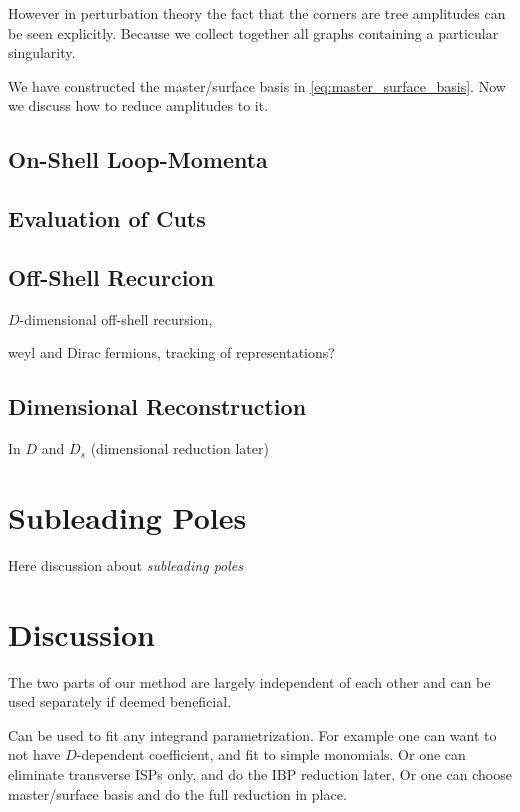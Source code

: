 However in perturbation theory the fact that the corners are tree amplitudes can be seen explicitly.
Because we collect together all graphs containing a particular singularity.


We have constructed the master/surface basis in \cref{eq:master_surface_basis}. Now we discuss how
to reduce amplitudes to it.


\subsection{On-Shell Loop-Momenta}


\subsection{Evaluation of Cuts}

\subsection{Off-Shell Recurcion}
\label{sec:BG_recursion}

$D$-dimensional off-shell recursion,


weyl and Dirac fermions,
tracking of representations?


\subsection{Dimensional Reconstruction}
 In $D$ and $D_s$ (dimensional reduction later)


\section{Subleading Poles}
Here discussion about \textit{subleading poles}


\section{Discussion}
The two parts of our method are largely independent of each other and can be used separately if deemed beneficial.

Can be used to fit any integrand parametrization. For example one
can want to not have $D$-dependent coefficient, and fit to simple monomials.
Or one can eliminate transverse ISPs only, and do the IBP reduction later.
Or one can choose master/surface basis and do the full reduction in place.

